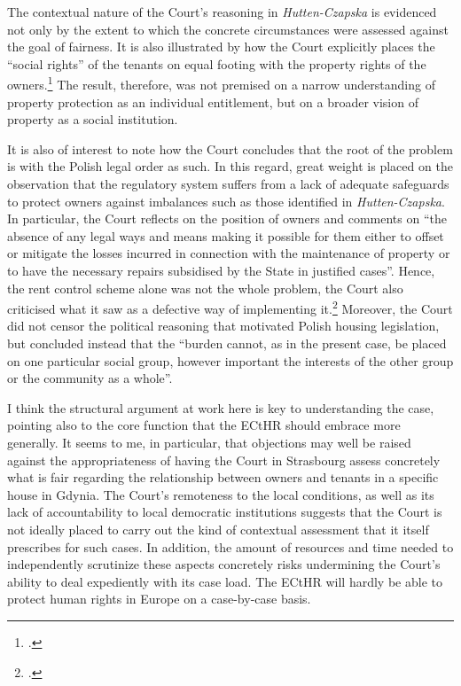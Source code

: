 The contextual nature of the Court's reasoning in {\it Hutten-Czapska} is evidenced not only by the extent to which the concrete circumstances were assessed against the goal of fairness. It is also illustrated by how the Court explicitly places the ``social rights'' of the tenants on equal footing with the property rights of the owners.\footcite[225]{hutten06} The result, therefore, was not premised on a narrow understanding of property protection as an individual entitlement, but on a broader vision of property as a social institution.

It is also of interest to note how the Court concludes that the root of the problem is with the Polish legal order as such. In this regard, great weight is placed on the observation that the regulatory system suffers from a lack of adequate safeguards to protect owners against imbalances such as those identified in {\it Hutten-Czapska}. In particular, the Court reflects on the position of owners and comments on ``the absence of any legal ways and means making it possible for them either to offset or mitigate the losses incurred in connection with the maintenance of property or to have the necessary repairs subsidised by the State in justified cases''. Hence, the rent control scheme alone was not the whole problem, the Court also criticised what it saw as a defective way of implementing it.\footcite[224]{hutten06} Moreover, the Court did not censor the political reasoning that motivated Polish housing legislation, but concluded instead that the ``burden cannot, as in the present case, be placed on one particular social group, however important the interests of the other group or the community as a whole''. 

I think the structural argument at work here is key to understanding the case, pointing also to the core function that the ECtHR should embrace more generally. It seems to me, in particular, that objections may well be raised against the appropriateness of having the Court in Strasbourg assess concretely what is fair regarding the relationship between owners and tenants in a specific house in Gdynia. The Court's remoteness to the local conditions, as well as its lack of accountability to local democratic institutions suggests that the Court is not ideally placed to carry out the kind of contextual assessment that it itself prescribes for such cases. In addition, the amount of resources and time needed to independently scrutinize these aspects concretely risks undermining the Court's ability to deal expediently with its case load. The ECtHR will hardly be able to protect human rights in Europe on a case-by-case basis.

